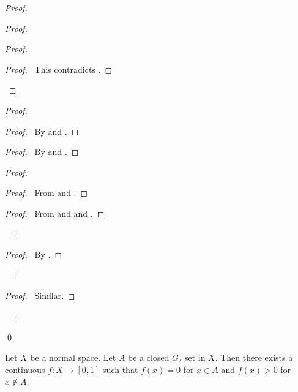 \begin{proof}
\begin{proof}
\begin{proof}
\begin{proof}
       \pf\ This contradicts .
     \end{proof}
   \end{proof}
   \begin{proof}
     \begin{proof}
       \pf\ By  and .
     \end{proof}
     \begin{proof}
       \pf\ By  and .
     \end{proof}
     \begin{proof}
       \begin{proof}
         \pf\ From  and .
       \end{proof}
       \qedstep
       \begin{proof}
         \pf\ From  and  and .
       \end{proof}
     \end{proof}
     \qedstep
     \begin{proof}
       \pf\ By .
     \end{proof}
   \end{proof}
   \begin{proof}
     \pf\ Similar.
   \end{proof}
 \end{proof}
 \qed
\end{proof}

\begin{lm}
Let $X$ be a normal space. Let $A$ be a closed $G_\delta$ set in $X$. Then there exists a continuous $f : X \rightarrow [0,1]$ such that $f(x) = 0$ for $x \in A$ and $f(x) > 0$ for $x \notin A$.
\end{lm}

